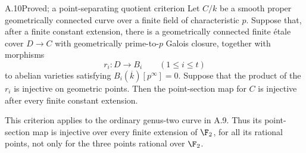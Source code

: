 \begin{claim}{A.10}{Proved; a point-separating quotient criterion}
Let $C/k$ be a smooth proper geometrically connected curve over a
finite field of characteristic $p$. Suppose that, after a finite
constant extension, there is a geometrically connected finite
\'etale cover $D\to C$ with geometrically prime-to-$p$ Galois
closure, together with morphisms
\[
 r_i:D\longrightarrow B_i\qquad(1\le i\le t)
\]
to abelian varieties satisfying
$B_i(\overline k)[p^\infty]=0$. Suppose that the product of the
$r_i$ is injective on geometric points. Then the point-section
map for $C$ is injective after every finite constant extension.

This criterion applies to the ordinary genus-two curve in A.9.
Thus its point-section map is injective over every finite
extension of $\F_2$, for all its rational points, not only for
the three points rational over $\F_2$.
\end{claim}
